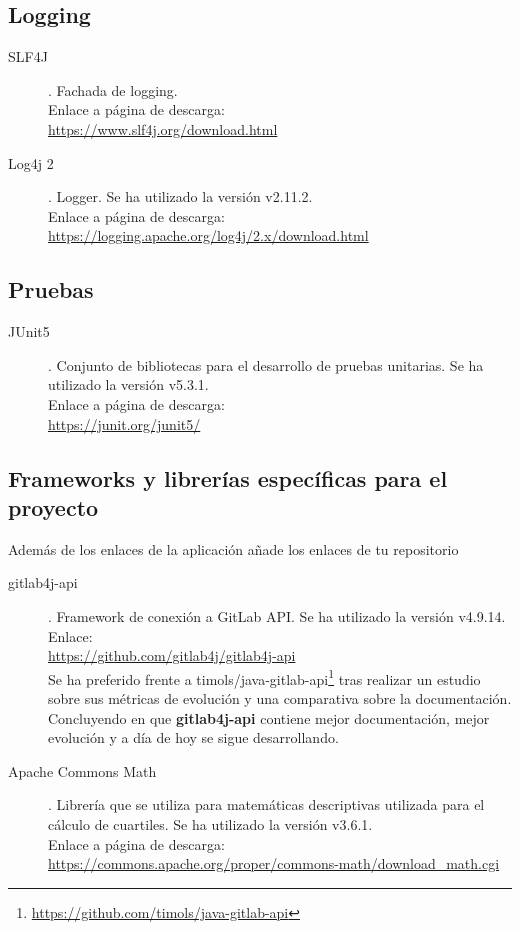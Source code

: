 \subsection{Logging}
\begin{description}
	\item[SLF4J]. Fachada de logging.\\ Enlace a página de descarga:\\ \url{https://www.slf4j.org/download.html}
	\item[Log4j 2]. Logger. Se ha utilizado la versión  v2.11.2.\\ Enlace a página de descarga:\\ \url{https://logging.apache.org/log4j/2.x/download.html}
\end{description}
\subsection{Pruebas}
\begin{description}
	\item[JUnit5]. Conjunto de bibliotecas para el desarrollo de pruebas unitarias. Se ha utilizado la versión  v5.3.1.\\ Enlace a página de descarga:\\ \url{https://junit.org/junit5/}
\end{description}
\subsection{Frameworks y librerías específicas para el proyecto}
\todo Además de los enlaces de la aplicación añade los enlaces de tu repositorio
\begin{description}
	\item[gitlab4j-api]. Framework de conexión a GitLab API. Se ha utilizado la versión  v4.9.14.\\ Enlace:\\ \url{https://github.com/gitlab4j/gitlab4j-api}\\
	Se ha preferido frente a timols/java-gitlab-api\footnote{\url{https://github.com/timols/java-gitlab-api}} tras realizar un estudio sobre sus métricas de evolución y una comparativa sobre la documentación. Concluyendo en que \textbf{gitlab4j-api} contiene mejor documentación, mejor evolución y a día de hoy se sigue desarrollando.
	\item[Apache Commons Math]. Librería que se utiliza para matemáticas descriptivas utilizada para el cálculo de cuartiles. Se ha utilizado la versión  v3.6.1.\\ Enlace a página de descarga:\\ \url{https://commons.apache.org/proper/commons-math/download_math.cgi}
\end{description}
